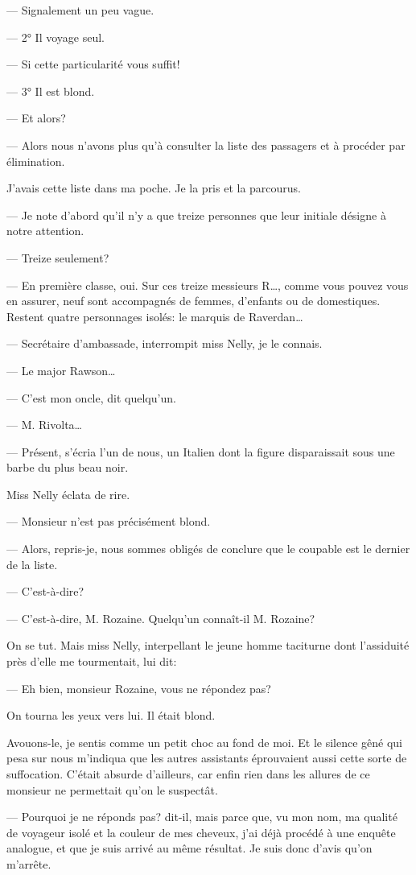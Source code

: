 \documentclass[12pt,a4paper]{book}
\begin{document}
— Signalement un peu vague.

— 2° Il voyage seul.

— Si cette particularité vous suffit!

— 3° Il est blond.

— Et alors?

— Alors nous n’avons plus qu’à consulter la liste des passagers et à procéder par élimination.

J’avais cette liste dans ma poche. Je la pris et la parcourus. 

— Je note d’abord qu’il n’y a que treize personnes que leur initiale désigne à notre attention.

— Treize seulement?

— En première classe, oui. Sur ces treize messieurs R…, comme vous pouvez vous en assurer, neuf sont accompagnés de femmes, d’enfants ou de domestiques. Restent quatre personnages isolés: le marquis de Raverdan…

— Secrétaire d’ambassade, interrompit miss Nelly, je le connais.

— Le major Rawson…

— C’est mon oncle, dit quelqu’un.

— M. Rivolta…

— Présent, s’écria l’un de nous, un Italien dont la figure disparaissait sous une barbe du plus beau noir.

Miss Nelly éclata de rire.

— Monsieur n’est pas précisément blond.

— Alors, repris-je, nous sommes obligés de conclure que le coupable est le dernier de la liste.

— C’est-à-dire?

— C’est-à-dire, M. Rozaine. Quelqu’un connaît-il M. Rozaine?

On se tut. Mais miss Nelly, interpellant le jeune homme taciturne dont l’assiduité près d’elle me tourmentait, lui dit:

— Eh bien, monsieur Rozaine, vous ne répondez pas? 

On tourna les yeux vers lui. Il était blond.

Avouons-le, je sentis comme un petit choc au fond de moi. Et le silence gêné qui pesa sur nous m’indiqua que les autres assistants éprouvaient aussi cette sorte de suffocation. C’était absurde d’ailleurs, car enfin rien dans les allures de ce monsieur ne permettait qu’on le suspectât.

— Pourquoi je ne réponds pas? dit-il, mais parce que, vu mon nom, ma qualité de voyageur isolé et la couleur de mes cheveux, j’ai déjà procédé à une enquête analogue, et que je suis arrivé au même résultat. Je suis donc d’avis qu’on m’arrête.
\end{document}
